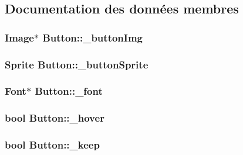 \subsection{Documentation des données membres}
\hypertarget{classButton_ad8070ded5669414c4f1d6f830a8845cd}{
\subsubsection[{\_\-buttonImg}]{\setlength{\rightskip}{0pt plus 5cm}Image$\ast$ {\bf Button::\_\-buttonImg}}}
\label{classButton_ad8070ded5669414c4f1d6f830a8845cd}
\hypertarget{classButton_a19a36bf37afc3e786033acee65a19850}{
\subsubsection[{\_\-buttonSprite}]{\setlength{\rightskip}{0pt plus 5cm}Sprite {\bf Button::\_\-buttonSprite}}}
\label{classButton_a19a36bf37afc3e786033acee65a19850}
\hypertarget{classButton_a062c470b5e08bec9e70d69899ad0ded9}{
\subsubsection[{\_\-font}]{\setlength{\rightskip}{0pt plus 5cm}Font$\ast$ {\bf Button::\_\-font}}}
\label{classButton_a062c470b5e08bec9e70d69899ad0ded9}
\hypertarget{classButton_a674a4ba8e5b673a5ad37f2c7872a7cf8}{
\subsubsection[{\_\-hover}]{\setlength{\rightskip}{0pt plus 5cm}bool {\bf Button::\_\-hover}}}
\label{classButton_a674a4ba8e5b673a5ad37f2c7872a7cf8}
\hypertarget{classButton_a751676486a9616cf332d65a8c711f1b7}{
\subsubsection[{\_\-keep}]{\setlength{\rightskip}{0pt plus 5cm}bool {\bf Button::\_\-keep}}}
